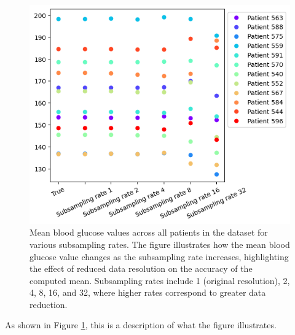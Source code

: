 \begin{figure}[ht] %
	\centering
	\includegraphics[width=\linewidth]{Figures/patients_mean.png} %
	\caption{Mean blood glucose values across all patients in the dataset for various subsampling rates. The figure illustrates how the mean blood glucose value changes as the subsampling rate increases, highlighting the effect of reduced data resolution on the accuracy of the computed mean. Subsampling rates include 1 (original resolution), 2, 4, 8, 16, and 32, where higher rates correspond to greater data reduction.}
	\label{fig:patients_mean}  %
\end{figure}

As shown in Figure \ref{fig:patients_mean}, this is a description of what the figure illustrates.

